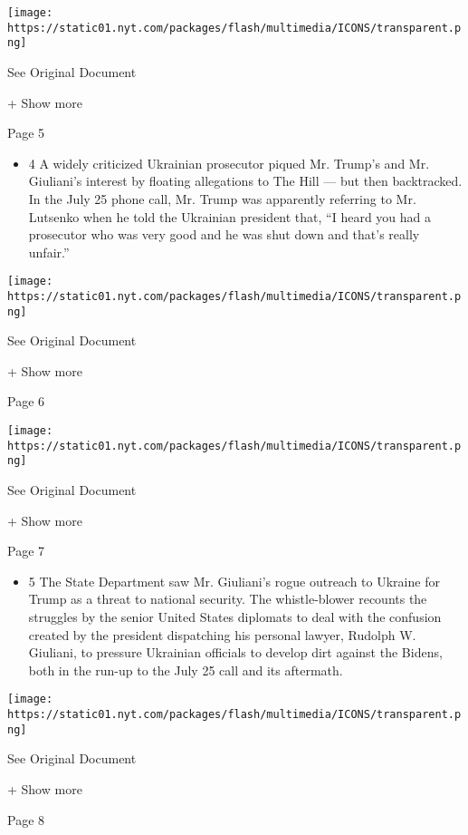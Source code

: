 \texttt{[image: https://static01.nyt.com/packages/flash/multimedia/ICONS/transparent.png]}

See Original Document

+ Show more

Page 5

\begin{itemize}
\tightlist
\item
  4 A widely criticized Ukrainian prosecutor piqued Mr. Trump's and Mr.
  Giuliani's interest by floating allegations to The Hill --- but then
  backtracked. In the July 25 phone call, Mr. Trump was apparently
  referring to Mr. Lutsenko when he told the Ukrainian president that,
  ``I heard you had a prosecutor who was very good and he was shut down
  and that's really unfair.''
\end{itemize}

\protect\hyperlink{}{}

\texttt{[image: https://static01.nyt.com/packages/flash/multimedia/ICONS/transparent.png]}

See Original Document

+ Show more

Page 6

\protect\hyperlink{}{}

\texttt{[image: https://static01.nyt.com/packages/flash/multimedia/ICONS/transparent.png]}

See Original Document

+ Show more

Page 7

\begin{itemize}
\tightlist
\item
  5 The State Department saw Mr. Giuliani's rogue outreach to Ukraine
  for Trump as a threat to national security. The whistle-blower
  recounts the struggles by the senior United States diplomats to deal
  with the confusion created by the president dispatching his personal
  lawyer, Rudolph W. Giuliani, to pressure Ukrainian officials to
  develop dirt against the Bidens, both in the run-up to the July 25
  call and its aftermath.
\end{itemize}

\protect\hyperlink{}{}

\texttt{[image: https://static01.nyt.com/packages/flash/multimedia/ICONS/transparent.png]}

See Original Document

+ Show more

Page 8

